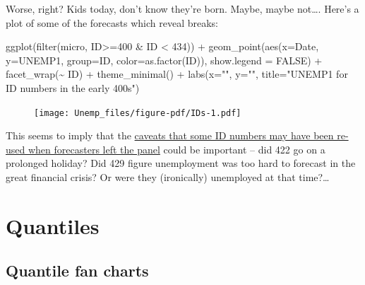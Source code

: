 \documentclass[
  letterpaper,
]{book}
\newenvironment{Shaded}{\begin{snugshade}}{\end{snugshade}}
\newcommand{\AttributeTok}[1]{\textcolor[rgb]{0.40,0.45,0.13}{#1}}
\newcommand{\ConstantTok}[1]{\textcolor[rgb]{0.56,0.35,0.01}{#1}}
\newcommand{\DecValTok}[1]{\textcolor[rgb]{0.68,0.00,0.00}{#1}}
\newcommand{\FunctionTok}[1]{\textcolor[rgb]{0.28,0.35,0.67}{#1}}
\newcommand{\NormalTok}[1]{\textcolor[rgb]{0.00,0.23,0.31}{#1}}
\newcommand{\SpecialCharTok}[1]{\textcolor[rgb]{0.37,0.37,0.37}{#1}}
\newcommand{\StringTok}[1]{\textcolor[rgb]{0.13,0.47,0.30}{#1}}
\begin{document}
Worse, right? Kids today, don't know they're born. Maybe, maybe
not\ldots. Here's a plot of some of the forecasts which reveal breaks:

\begin{Shaded}
\begin{Highlighting}[]
\FunctionTok{ggplot}\NormalTok{(}\FunctionTok{filter}\NormalTok{(micro, ID}\SpecialCharTok{\textgreater{}=}\DecValTok{400} \SpecialCharTok{\&}\NormalTok{ ID }\SpecialCharTok{\textless{}} \DecValTok{434}\NormalTok{)) }\SpecialCharTok{+} 
  \FunctionTok{geom\_point}\NormalTok{(}\FunctionTok{aes}\NormalTok{(}\AttributeTok{x=}\NormalTok{Date, }\AttributeTok{y=}\NormalTok{UNEMP1, }\AttributeTok{group=}\NormalTok{ID, }\AttributeTok{color=}\FunctionTok{as.factor}\NormalTok{(ID)), }\AttributeTok{show.legend =} \ConstantTok{FALSE}\NormalTok{) }\SpecialCharTok{+} 
  \FunctionTok{facet\_wrap}\NormalTok{(}\SpecialCharTok{\textasciitilde{}}\NormalTok{ ID) }\SpecialCharTok{+} 
  \FunctionTok{theme\_minimal}\NormalTok{() }\SpecialCharTok{+} 
  \FunctionTok{labs}\NormalTok{(}\AttributeTok{x=}\StringTok{""}\NormalTok{, }\AttributeTok{y=}\StringTok{""}\NormalTok{, }\AttributeTok{title=}\StringTok{"UNEMP1 for ID numbers in the early 400s"}\NormalTok{)}
\end{Highlighting}
\end{Shaded}

\begin{figure}[H]

{\centering \texttt{[image: Unemp\_files/figure-pdf/IDs-1.pdf]}

}

\end{figure}

This seems to imply that the
\href{https://www.philadelphiafed.org/-/media/research-and-data/real-time-center/survey-of-professional-forecasters/spf-caveats.pdf}{caveats
that some ID numbers may have been re-used when forecasters left the
panel} could be important -- did 422 go on a prolonged holiday? Did 429
figure unemployment was too hard to forecast in the great financial
crisis? Or were they (ironically) unemployed at that time?\ldots{}

\part{Quantiles}

\hypertarget{quantile-fan-charts}{%
\chapter{Quantile fan charts}\label{quantile-fan-charts}}
\end{document}
